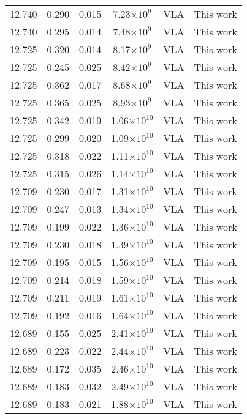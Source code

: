 \documentclass{aa}
\begin{document}
{\begin{longtable}{c|c|c|c|c|c}
 12.740 &   0.290   &  0.015 &  7.23$\times 10^{9}$  &  VLA & This work \\
 12.740 &   0.295   &  0.014 &  7.48$\times 10^{9}$  &  VLA & This work \\
 12.725 &   0.320   &  0.014 &  8.17$\times 10^{9}$  &  VLA & This work \\
 12.725 &   0.245   &  0.025 &  8.42$\times 10^{9}$  &  VLA & This work \\
 12.725 &   0.362   &  0.017 &  8.68$\times 10^{9}$  &  VLA & This work \\
 12.725 &   0.365   &  0.025 &  8.93$\times 10^{9}$  &  VLA & This work \\
 12.725 &   0.342   &  0.019 &  1.06$\times 10^{10}$ &  VLA & This work \\
 12.725 &   0.299   &  0.020 &  1.09$\times 10^{10}$ &  VLA & This work \\
 12.725 &   0.318   &  0.022 &  1.11$\times 10^{10}$ &  VLA & This work \\
 12.725 &   0.315   &  0.026 &  1.14$\times 10^{10}$ &  VLA & This work \\
 12.709 &   0.230   &  0.017 &  1.31$\times 10^{10}$ &  VLA & This work \\
 12.709 &   0.247   &  0.013 &  1.34$\times 10^{10}$ &  VLA & This work \\
 12.709 &   0.199   &  0.022 &  1.36$\times 10^{10}$ &  VLA & This work \\
 12.709 &   0.230   &  0.018 &  1.39$\times 10^{10}$ &  VLA & This work \\
 12.709 &   0.195   &  0.015 &  1.56$\times 10^{10}$ &  VLA & This work \\
 12.709 &   0.214   &  0.018 &  1.59$\times 10^{10}$ &  VLA & This work \\
 12.709 &   0.211   &  0.019 &  1.61$\times 10^{10}$ &  VLA & This work \\
 12.709 &   0.192   &  0.016 &  1.64$\times 10^{10}$ &  VLA & This work \\
 12.689 &   0.155   &  0.025 &  2.41$\times 10^{10}$ &  VLA & This work \\
 12.689 &   0.223   &  0.022 &  2.44$\times 10^{10}$ &  VLA & This work \\
 12.689 &   0.172   &  0.035 &  2.46$\times 10^{10}$ &  VLA & This work \\
 12.689 &   0.183   &  0.032 &  2.49$\times 10^{10}$ &  VLA & This work \\
 12.689 &   0.183   &  0.021 &  1.88$\times 10^{10}$ &  VLA & This work \\

\end{longtable}}
\end{document}
